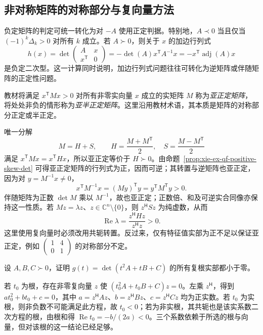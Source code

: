 \subsection{非对称矩阵的对称部分与复向量方法}

负定矩阵的判定可统一转化为对 $-A$ 使用正定判据。特别地，$A\prec0$ 当且仅当 $(-1)^k\Delta_k>0$ 对所有 $k$ 成立。若 $A\succ0$，则关于 $x$ 的加边行列式
\[
 h(x)=\det\begin{pmatrix}A&x\\x^{\mathsf T}&0\end{pmatrix}
     =-\det(A)x^{\mathsf T}A^{-1}x
     =-x^{\mathsf T}\operatorname{adj}(A)x
\]
是负定二次型。这一计算同时说明，加边行列式问题往往可转化为逆矩阵或伴随矩阵的正定性问题。

\begin{definition}
教材将满足 $x^{\mathsf T}Mx>0$ 对所有非零实向量 $x$ 成立的实矩阵 $M$ 称为\emph{亚正定矩阵}，将处处非负的情形称为\emph{亚半正定矩阵}。这里沿用教材术语，其本质是矩阵的对称部分正定或半正定。
\end{definition}

唯一分解
\[
 M=H+S,\qquad H=\frac{M+M^{\mathsf T}}2,\quad
 S=\frac{M-M^{\mathsf T}}2
\]
满足 $x^{\mathsf T}Mx=x^{\mathsf T}Hx$，所以亚正定等价于 $H\succ0$。由命题~\ref{prop:xie-ex-qf-positive-skew-det} 可得亚正定矩阵的行列式为正，因而可逆；其转置与逆矩阵也亚正定，因为对 $y=M^{-1}x\ne0$，
\[
 x^{\mathsf T}M^{-1}x=(My)^{\mathsf T}y=y^{\mathsf T}M^{\mathsf T}y>0.
\]
伴随矩阵为正数 $\det M$ 乘以 $M^{-1}$，故也亚正定；正数倍、和及可逆实合同像亦保持这一性质。若 $Mz=\lambda z$、$z\in\mathbb C^n\setminus\{0\}$，则 $z^{\mathsf H}Sz$ 为纯虚数，从而
\[
 \operatorname{Re}\lambda=\frac{z^{\mathsf H}Hz}{z^{\mathsf H}z}>0.
\]
这里使用复向量时必须改用共轭转置。反过来，仅有特征值实部为正不足以保证亚正定，例如 $\begin{pmatrix}1&4\\0&1\end{pmatrix}$ 的对称部分不定。

\begin{example}
设 $A,B,C\succ0$，证明 $g(t)=\det(t^2A+tB+C)$ 的所有复根实部都小于零。
\end{example}
\begin{solve}
若 $t_0$ 为根，存在非零复向量 $z$ 使 $(t_0^2A+t_0B+C)z=0$。左乘 $z^{\mathsf H}$，得到 $at_0^2+bt_0+c=0$，其中 $a=z^{\mathsf H}Az$、$b=z^{\mathsf H}Bz$、$c=z^{\mathsf H}Cz$ 均为正实数。若 $t_0$ 为实根，则非负数不可能满足此方程，故 $t_0<0$；若为非实根，其共轭也是该实系数二次方程的根，由根和得 $\operatorname{Re}t_0=-b/(2a)<0$。三个系数依赖于所选的根与向量，但对该根的这一结论已经足够。
\end{solve}

